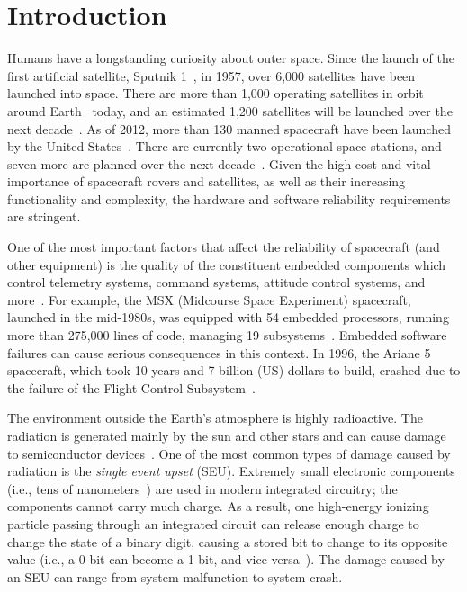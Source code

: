 \vspace{-35pt}
\section{Introduction}\label{sec:introduction}
\vspace{-10pt}

Humans have a longstanding curiosity about outer space. Since the launch of the first artificial satellite, Sputnik 1~\cite{sputnik1}, in 1957, over 6,000 satellites have been launched into space. There are more than 1,000 operating satellites in orbit around Earth~\cite{satellite:total} today, and an estimated 1,200 satellites will be launched over the next decade~\cite{satellite:next10years}. As of 2012, more than 130 manned spacecraft have been launched by the United States~\cite{space:shuttle:list}. There are currently two operational space stations, and seven more are planned over the next decade~\cite{space:station:tiangong2}\cite{space:station:almaz}\cite{space:station:opsek}\cite{space:station:tiangong3}. Given the high cost and vital importance of spacecraft rovers and satellites, as well as their increasing functionality and complexity, the hardware and software reliability requirements are stringent.

One of the most important factors that affect the reliability of spacecraft (and other equipment) is the quality of the constituent embedded components which control telemetry systems, command systems, attitude control systems, and more~\cite{fundamentals:space}. For example, the MSX (Midcourse Space Experiment) spacecraft, launched in the mid-1980s, was equipped with 54 embedded processors, running more than 275,000 lines of code, managing 19 subsystems~\cite{fundamentals:space}. Embedded software failures can cause serious consequences in this context. In 1996, the Ariane 5 spacecraft, which took 10 years and 7 billion (US) dollars to build, crashed due to the failure of the Flight Control Subsystem~\cite{ariane5}.

The environment outside the Earth's atmosphere is highly radioactive. The radiation is generated mainly by the sun and other stars and can cause damage to semiconductor devices~\cite{fundamentals:space}. One of the most common types of damage caused by radiation is the \textit{single event upset} (SEU). Extremely small electronic components (i.e., tens of nanometers~\cite{intel:chip:size}) are used in modern integrated circuitry; the components cannot carry much charge. As a result, one high-energy ionizing particle passing through an integrated circuit can release enough charge to change the state of a binary digit, causing a stored bit to change to its opposite value (i.e., a 0-bit can become a 1-bit, and vice-versa~\cite{fundamentals:space}). The damage caused by an SEU can range from system malfunction to system crash.

